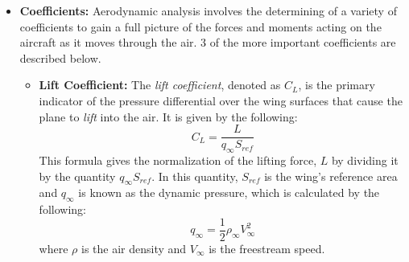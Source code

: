 \documentclass{report}
\begin{document}
\begin{itemize}
    Another important consideration in Mach number is the speed of the air molecules over the top of the wings. As a consequence of lift (pressure differential between the top and bottom of the wings), air moves faster over the top of the wing. Because of this, the local Mach number over the upper surface will be greater than the above calculated Mach number for the airplane.
    As a consequence of this, in order for the aircraft to avoid the adverse affects of compressibility drag, it will need to travel at a lower Mach number to prevent the air speed over the wings to be less than the speed of sound. Typical jet airliners cruise at a Mach number around 0.75 to reduce the risk of compressibility drag.
    \item[] \textbf{Coefficients:} Aerodynamic analysis involves the determining of a variety of coefficients to gain a full picture of the forces and moments acting on the aircraft as it moves through the air. 3 of the more important coefficients are described below.
    \begin{itemize}
        \item[] \textbf{Lift Coefficient:} The \textit{lift coefficient}, denoted as $C_L$, is the primary indicator of the pressure differential over the wing surfaces that cause the plane to \textit{lift} into the air.
        It is given by the following:
        \begin{equation}
            C_L = \frac{L}{q_{\infty} S_{ref}}\label{lift_coefficient}
        \end{equation}
        This formula gives the normalization of the lifting force, $L$ by dividing it by the quantity $q_{\infty} S_{ref}$. In this quantity, $S_{ref}$ is the wing's reference area and $q_{\infty}$ is known as the dynamic pressure, which is calculated by the following:
        \begin{equation}
        q_{\infty} = \frac{1}{2} \rho_{\infty} V_{\infty}^2\label{dynamic_pressure}
        \end{equation}
        where $\rho$ is the air density and $V_{\infty}$ is the freestream speed.


\end{itemize}
\end{itemize}
\end{document}
